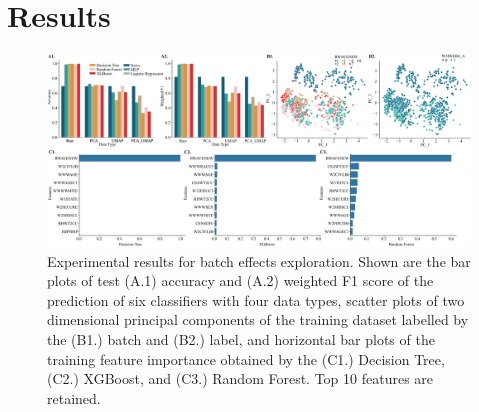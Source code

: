 \section{Results}\label{sec:results}
\begin{table}[!t]
\caption{Classifiers with top 5 testing accuracy combined with baseline and augmentation results.}
\label{tab:table2}
\end{table}

\begin{figure}[t!]
    \centering
    \includegraphics[width=\linewidth]{Figures/Figure2.pdf}
    \caption{Experimental results for batch effects exploration. Shown are the bar plots of test (A.1) accuracy and (A.2) weighted F1 score of the prediction of six classifiers with four data types, scatter plots of two dimensional principal components of the training dataset labelled by the (B1.) batch and (B2.) label, and horizontal bar plots of the training feature importance obtained by the (C1.) Decision Tree, (C2.) XGBoost, and (C3.) Random Forest. Top 10 features are retained. }
    \label{fig:figure2}
\end{figure} 

